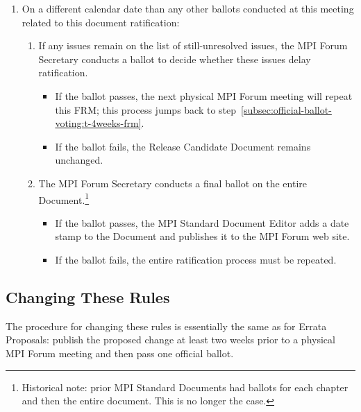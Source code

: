 {{\begin{enumerate}
\begin{enumerate}
  \item On a different calendar date than any other ballots conducted
    at this meeting related to this document ratification:
    \begin{enumerate}
    \item If any issues remain on the list of still-unresolved issues,
      the MPI Forum Secretary conducts a ballot to decide whether
      these issues delay ratification.
      \begin{itemize}
      \item If the ballot passes, the next physical MPI Forum meeting
        will repeat this FRM; this process jumps back to
        step~\ref{subsec:official-ballot-voting:t-4weeks-frm}.
      \item If the ballot fails, the Release Candidate Document
        remains unchanged.
      \end{itemize}
    \item The MPI Forum Secretary conducts a final ballot on the
      entire Document.\footnote{Historical note: prior MPI Standard
        Documents had ballots for each chapter and then the entire
        document.  This is no longer the case.}
      \begin{itemize}
      \item If the ballot passes, the MPI Standard Document Editor adds
        a date stamp to the Document and publishes it to the MPI Forum
        web site.
      \item If the ballot fails, the entire ratification process must be
        repeated.
      \end{itemize}
    \end{enumerate}
  \end{enumerate}
\end{enumerate}

}} %


\subsection{Changing These Rules}

The procedure for changing these rules is essentially the same as for
Errata Proposals: publish the proposed change at least two weeks prior
to a physical MPI Forum meeting and then pass one official ballot.

{\color{red}{The new rules take effect as soon as they are
  approved/voted in by the MPI Forum.}}

